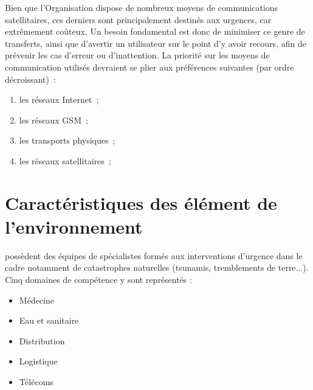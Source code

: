 \begin{constraint}
Bien que l'Organisation dispose de nombreux moyens de communications satellitaires, ces derniers sont principalement destinés aux urgences, car extrêmement coûteux. Un besoin fondamental est donc de minimiser ce genre de transferts, ainsi que d'avertir un utilisateur sur le point d'y avoir recours, afin de prévenir les cas d'erreur ou d'inattention.
La priorité sur les moyens de communication utilisés devraient se plier aux préférences suivantes (par ordre décroissant)~:
\begin{enumerate}
	\item les réseaux Internet~;
	\item les réseaux GSM~;
	\item les transports physiques~;
	\item les réseaux satellitaires~;
\end{enumerate}
\end{constraint}



\section{Caractéristiques des élément de l'environnement}
\mo possèdent des équipes de spécialistes formés aux interventions d'urgence dans le cadre notamment de catastrophes naturelles (tsunamis, tremblements de terre...).
Cinq domaines de compétence y sont représentés :
\begin{itemize}
\item Médecine
\item Eau et sanitaire
\item Distribution
\item Logistique
\item Télécoms
\end{itemize}
